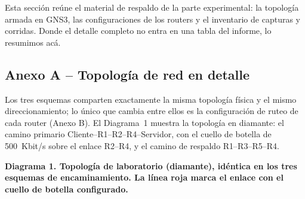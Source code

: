 \documentclass[11pt,a4paper]{article}
\newcommand{\figcaption}[1]{\par\noindent\footnotesize\textbf{#1}\par\vspace{0.4cm}}
\begin{document}
Esta secci\'on re\'une el material de respaldo de la parte experimental: la topolog\'ia armada en GNS3, las configuraciones de los routers y el inventario de capturas y corridas. Donde el detalle completo no entra en una tabla del informe, lo resumimos ac\'a.

\subsection*{Anexo A -- Topolog\'ia de red en detalle}

Los tres esquemas comparten exactamente la misma topolog\'ia f\'isica y el mismo direccionamiento; lo \'unico que cambia entre ellos es la configuraci\'on de ruteo de cada router (Anexo B). El Diagrama~1 muestra la topolog\'ia en diamante: el camino primario Cliente--R1--R2--R4--Servidor, con el cuello de botella de 500~Kbit/s sobre el enlace R2--R4, y el camino de respaldo R1--R3--R5--R4.

\needspace{4cm}
\begin{center}
\par\vspace{0.1cm}
\figcaption{Diagrama 1. Topolog\'ia de laboratorio (diamante), id\'entica en los tres esquemas de encaminamiento. La l\'inea roja marca el enlace con el cuello de botella configurado.}
\end{center}
\end{document}
